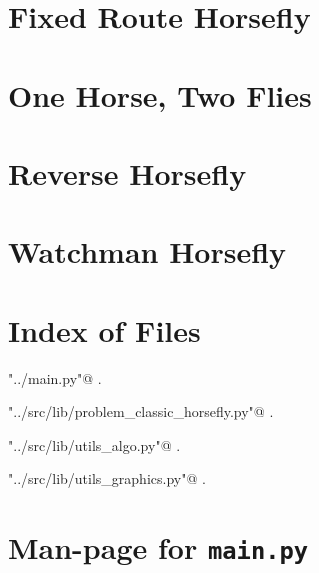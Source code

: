 \documentclass[11.5pt]{report}
\begin{document}
\label{chap:segment-horsefly}\chapter{Fixed Route Horsefly}
\label{chap:fixed-route-horsefly}\chapter{One Horse, Two Flies}
\label{chap:one-horse-two-flies}
\chapter{Reverse Horsefly}
\label{chap:reverse-horsefly}\chapter{Watchman Horsefly}
\label{watchman-horsefly}

\begin{appendices}
\chapter{Index of Files}

{\small\begin{list}{}{\setlength{\itemsep}{-\parsep}\setlength{\itemindent}{-\leftmargin}}
\item \verb@"../main.py"@ {\footnotesize {\NWtxtDefBy} .}
\item \verb@"../src/lib/problem_classic_horsefly.py"@ {\footnotesize {\NWtxtDefBy} .}
\item \verb@"../src/lib/utils_algo.py"@ {\footnotesize {\NWtxtDefBy} .
}
\item \verb@"../src/lib/utils_graphics.py"@ {\footnotesize {\NWtxtDefBy} .
}
\end{list}}
\chapter{Man-page for \texttt{main.py}}


\end{appendices}
\end{document}
